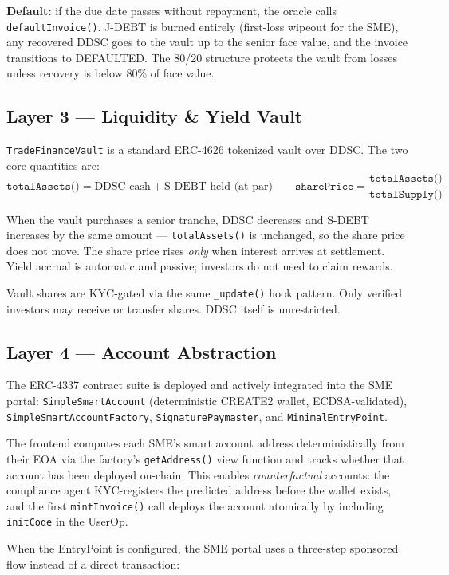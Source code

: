 \documentclass[11pt,a4paper]{article}
\begin{document}
\textbf{Default:} if the due date passes without repayment, the oracle calls
\texttt{defaultInvoice()}. J-DEBT is burned entirely (first-loss wipeout for the SME),
any recovered DDSC goes to the vault up to the senior face value, and the invoice
transitions to DEFAULTED. The 80/20 structure protects the vault from losses unless
recovery is below 80\% of face value.

\subsection{Layer 3 — Liquidity \& Yield Vault}

\texttt{TradeFinanceVault} is a standard ERC-4626 tokenized vault over DDSC. The two
core quantities are:
\[
  \texttt{totalAssets()} = \text{DDSC cash} + \text{S-DEBT held (at par)}
  \qquad
  \texttt{sharePrice} = \frac{\texttt{totalAssets()}}{\texttt{totalSupply()}}
\]

When the vault purchases a senior tranche, DDSC decreases and S-DEBT increases by the same
amount — \texttt{totalAssets()} is unchanged, so the share price does not move. The share
price rises \emph{only} when interest arrives at settlement. Yield accrual is automatic and
passive; investors do not need to claim rewards.

Vault shares are KYC-gated via the same \texttt{\_update()} hook pattern. Only verified
investors may receive or transfer shares. DDSC itself is unrestricted.

\subsection{Layer 4 — Account Abstraction}

The ERC-4337 contract suite is deployed and actively integrated into the SME portal:
\texttt{SimpleSmartAccount} (deterministic CREATE2 wallet, ECDSA-validated),
\texttt{SimpleSmartAccountFactory}, \texttt{SignaturePaymaster}, and
\texttt{MinimalEntryPoint}.

The frontend computes each SME's smart account address deterministically from their
EOA via the factory's \texttt{getAddress()} view function and tracks whether that
account has been deployed on-chain. This enables \emph{counterfactual} accounts:
the compliance agent KYC-registers the predicted address before the wallet exists,
and the first \texttt{mintInvoice()} call deploys the account atomically by including
\texttt{initCode} in the UserOp.

When the EntryPoint is configured, the SME portal uses a three-step sponsored flow
instead of a direct transaction:
\end{document}
